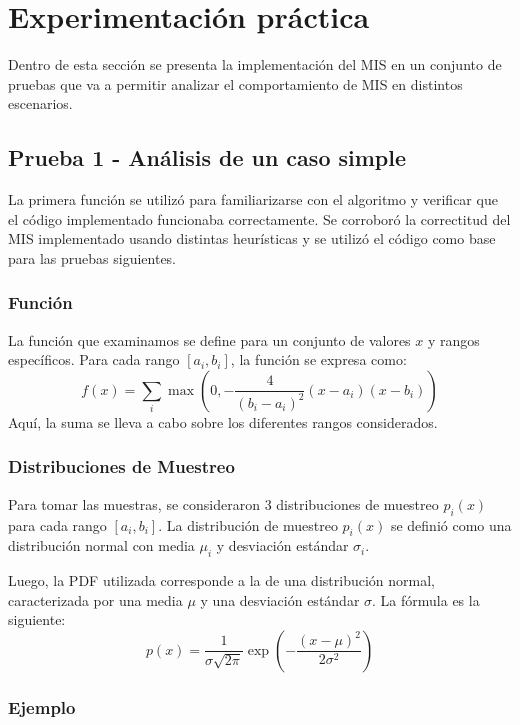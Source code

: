 \documentclass{article}
\begin{document}
\section{Experimentación práctica}

Dentro de esta sección se presenta la implementación del MIS en un conjunto de pruebas que va a permitir analizar el comportamiento de MIS en distintos escenarios.

\subsection{Prueba 1 - Análisis de un caso simple}

La primera función se utilizó para familiarizarse con el algoritmo y verificar que el código implementado funcionaba correctamente.
Se corroboró la correctitud del MIS implementado usando distintas heurísticas y se utilizó el código como base para las pruebas siguientes.

\subsubsection{Función}
La función que examinamos se define para un conjunto de valores \( x \) y rangos específicos. Para cada rango \( [a_{i}, b_{i}] \), la función se expresa como:
$$
f(x) = \sum_{i} \max\left(0, -\frac{4}{(b_{i} - a_{i})^2} (x - a_{i})(x - b_{i})\right)
$$
Aquí, la suma se lleva a cabo sobre los diferentes rangos considerados.

\subsubsection{Distribuciones de Muestreo}

Para tomar las muestras, se consideraron 3 distribuciones de muestreo \( p_{i}(x) \) para cada rango \( [a_{i}, b_{i}] \).
La distribución de muestreo \( p_{i}(x) \) se definió como una distribución normal con media \( \mu_{i} \) y desviación estándar \( \sigma_{i} \).

Luego, la PDF utilizada corresponde a la de una distribución normal, caracterizada por una media \( \mu \) y una desviación estándar \( \sigma \). La fórmula es la siguiente:
$$
p(x) = \frac{1}{\sigma \sqrt{2\pi}} \exp\left(-\frac{(x - \mu)^2}{2\sigma^2}\right)
$$


\subsubsection{Ejemplo}
\end{document}
